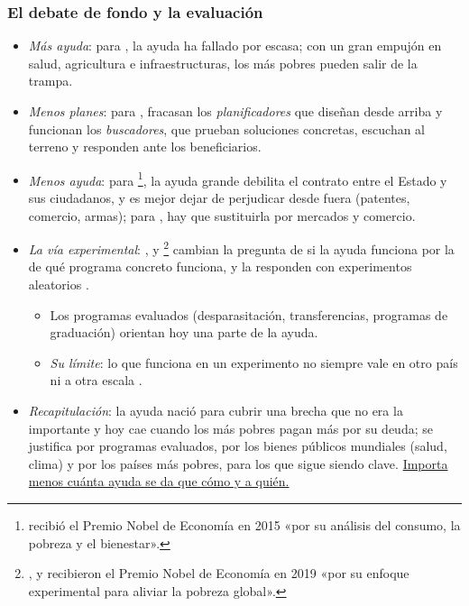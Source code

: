 \documentclass[11pt]{article}
\begin{document}
\subsubsection{El debate de fondo y la evaluación}\label{sec:aod-debate}

\begin{itemize}
\item \emph{Más ayuda}: para , la ayuda ha fallado por escasa; con un gran empujón en salud, agricultura e infraestructuras, los más pobres pueden salir de la trampa\nocite{Sachs2005}.
\item \emph{Menos planes}: para , fracasan los \emph{planificadores} que diseñan desde arriba y funcionan los \emph{buscadores}, que prueban soluciones concretas, escuchan al terreno y responden ante los beneficiarios\nocite{Easterly2006}.
\item \emph{Menos ayuda}: para \footnote{ recibió el Premio Nobel de Economía en 2015 «por su análisis del consumo, la pobreza y el bienestar»\nocite{Nobel2015Deaton}.}, la ayuda grande debilita el contrato entre el Estado y sus ciudadanos, y es mejor dejar de perjudicar desde fuera (patentes, comercio, armas)\nocite{Deaton2013}; para , hay que sustituirla por mercados y comercio\nocite{Moyo2009}.
\item \emph{La vía experimental}: ,  y \footnote{,  y  recibieron el Premio Nobel de Economía en 2019 «por su enfoque experimental para aliviar la pobreza global»\nocite{NobelPrize2019}.} cambian la pregunta de si la ayuda funciona por la de qué programa concreto funciona, y la responden con experimentos aleatorios\nocite{BanerjeeDuflo2011} .
  \begin{itemize}
  \item Los programas evaluados (desparasitación, transferencias, programas de graduación) orientan hoy una parte de la ayuda.
  \item \emph{Su límite}: lo que funciona en un experimento no siempre vale en otro país ni a otra escala\nocite{Deaton2010} .
  \end{itemize}
\end{itemize}

\begin{itemize}
\item \emph{Recapitulación}: la ayuda nació para cubrir una brecha que no era la importante y hoy cae cuando los más pobres pagan más por su deuda; se justifica por programas evaluados, por los bienes públicos mundiales (salud, clima) y por los países más pobres, para los que sigue siendo clave. \uline{Importa menos cuánta ayuda se da que cómo y a quién.}
\end{itemize}
\end{document}
